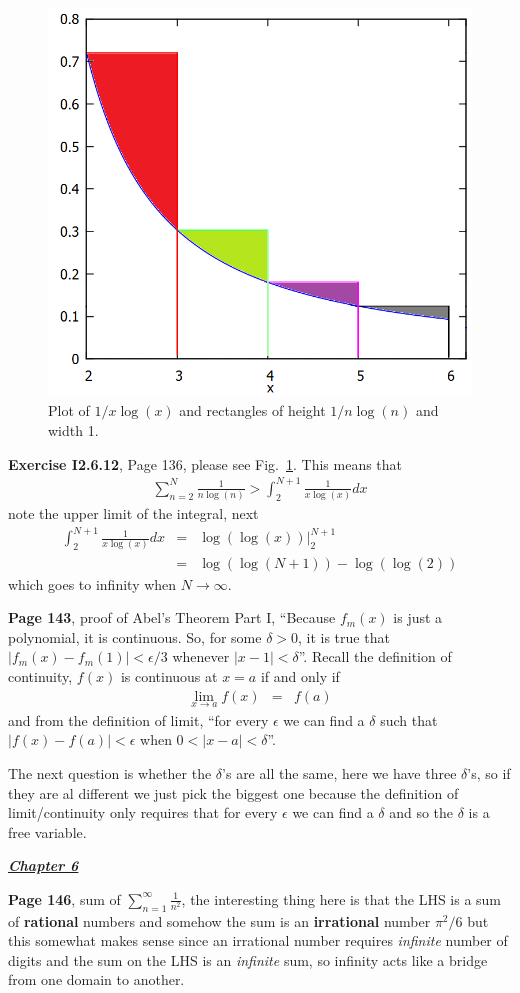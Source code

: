 \documentclass[aps,preprint,preprintnumbers,nofootinbib,showpacs,prd]{revtex4-1}
\newcommand{\nbea}{\begin{eqnarray*}}
\newcommand{\neea}{\end{eqnarray*}}
\begin{document}
%
\begin{figure}
\centering
  \includegraphics[width=.7\linewidth]{ExerciseI2_6_12.png}
  \caption{Plot of $1/x\log(x)$ and rectangles of height $1/n\log(n)$ and width 1.}
\label{fig:I2.6.12}
\end{figure}
%
{\bf Exercise I2.6.12}, Page 136, please see Fig.~\ref{fig:I2.6.12}. This means that
%
\nbea
\sum_{n=2}^N \frac{1}{n\log(n)} > \int_2^{N+1} \frac{1}{x\log(x)} dx
\neea
%
note the upper limit of the integral, next
%
\nbea
\int_2^{N+1} \frac{1}{x\log(x)} dx & = & \left.\log(\log(x))\right|_2^{N+1} \\
& = & \log(\log(N+1)) - \log(\log(2))
\neea
%
which goes to infinity when $N\to\infty$.

{\bf Page 143}, proof of Abel's Theorem Part I, ``Because $f_m(x)$ is just a polynomial, it is continuous. So, for some $\delta>0$, it is true that $|f_m(x) - f_m(1)|<\epsilon/3$ whenever $|x-1|<\delta$''. Recall the definition of continuity, $f(x)$ is continuous at $x=a$ if and only if
%
\nbea
\lim_{x\to a} f(x) & = & f(a)
\neea
%
and from the definition of limit, ``for every $\epsilon$ we can find a $\delta$ such that $|f(x) - f(a)|<\epsilon$ when $0 <|x-a|<\delta$''.

The next question is whether the $\delta$'s are all the same, here we have three $\delta$'s, so if they are al different we just pick the biggest one because the definition of limit/continuity only requires that for every $\epsilon$ we can find a $\delta$ and so the $\delta$ is a free variable.

\bigskip
\underline{\textit{\textbf{Chapter 6}}}
\bigskip

{\bf Page 146}, sum of $\sum_{n=1}^\infty \frac{1}{n^2}$, the interesting thing here is that the LHS is a sum of {\bf rational} numbers and somehow the sum is an {\bf irrational} number $\pi^2/6$ but this somewhat makes sense since an irrational number requires {\it infinite} number of digits and the sum on the LHS is an {\it infinite} sum, so infinity acts like a bridge from one domain to another.
\end{document}
